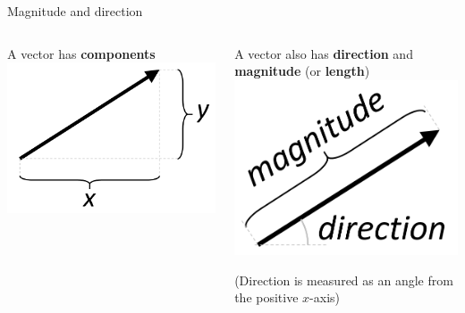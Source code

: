 \begin{frame}{Magnitude and direction}
	\begin{columns}
		\begin{column}{0.48\textwidth}
			\pause A vector has \textbf{components}
			\pause \includegraphics[width=\textwidth]{vector_components}
		\end{column}
		\begin{column}{0.48\textwidth}
			\pause A vector also has \textbf{direction} and \textbf{magnitude} (or \textbf{length})
			\pause \includegraphics[width=\textwidth]{vector_polar}
			
			\pause (Direction is measured as an angle from the positive $x$-axis)
		\end{column}
	\end{columns}
\end{frame}

